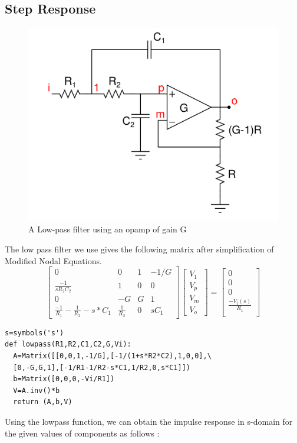 \documentclass[11pt, a4paper]{article}
\begin{document}
\subsection{Step Response}
\begin{figure}[!tbh]
   	\centering
   	\includegraphics[scale=0.5]{fig6.png}  %
   	\caption{A Low-pass filter using an opamp of gain G}
   	\label{fig:sample}
   \end{figure} 
   The low pass filter we use gives the following matrix after simplification of Modified Nodal Equations.
\[
\begin{bmatrix}
    0   & 0 & 1  & -1/G \\
    \frac{-1}{sR_2C_2}  & 1 & 0 & 0\\
    0  & -G & G & 1 \\
    \frac{-1}{R_1} - \frac{1}{R_2} - s*C_1 & \frac{1}{R_2} & 0 & sC_1
\end{bmatrix}
\begin{bmatrix}
    V_1\\
    V_p\\
    V_m \\
    V_o
\end{bmatrix}
=
\begin{bmatrix}
    0 \\
    0 \\
    0 \\
    \frac{-V_i(s)}{R_1} \\
    
\end{bmatrix}
\]
\begin{verbatim}	
s=symbols('s') 
def lowpass(R1,R2,C1,C2,G,Vi): 
  A=Matrix([[0,0,1,-1/G],[-1/(1+s*R2*C2),1,0,0],\
  [0,-G,G,1],[-1/R1-1/R2-s*C1,1/R2,0,s*C1]])
  b=Matrix([0,0,0,-Vi/R1])
  V=A.inv()*b
  return (A,b,V)
\end{verbatim}
Using the lowpass function, we can obtain the impulse response in s-domain for the given values of components as follows :
\end{document}

